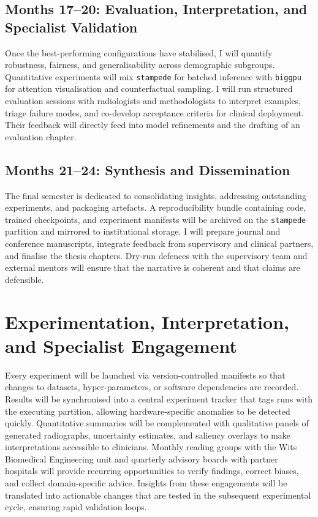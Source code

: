 \subsection{Months 17--20: Evaluation, Interpretation, and Specialist Validation}
Once the best-performing configurations have stabilised, I will quantify robustness, fairness, and generalisability across demographic subgroups. Quantitative experiments will mix \texttt{stampede} for batched inference with \texttt{biggpu} for attention visualisation and counterfactual sampling. I will run structured evaluation sessions with radiologists and methodologists to interpret examples, triage failure modes, and co-develop acceptance criteria for clinical deployment. Their feedback will directly feed into model refinements and the drafting of an evaluation chapter.
\subsection{Months 21--24: Synthesis and Dissemination}
The final semester is dedicated to consolidating insights, addressing outstanding experiments, and packaging artefacts. A reproducibility bundle containing code, trained checkpoints, and experiment manifests will be archived on the \texttt{stampede} partition and mirrored to institutional storage. I will prepare journal and conference manuscripts, integrate feedback from supervisory and clinical partners, and finalise the thesis chapters. Dry-run defences with the supervisory team and external mentors will ensure that the narrative is coherent and that claims are defensible.

\section{Experimentation, Interpretation, and Specialist Engagement}
Every experiment will be launched via version-controlled manifests so that changes to datasets, hyper-parameters, or software dependencies are recorded. Results will be synchronised into a central experiment tracker that tags runs with the executing partition, allowing hardware-specific anomalies to be detected quickly. Quantitative summaries will be complemented with qualitative panels of generated radiographs, uncertainty estimates, and saliency overlays to make interpretations accessible to clinicians. Monthly reading groups with the Wits Biomedical Engineering unit and quarterly advisory boards with partner hospitals will provide recurring opportunities to verify findings, correct biases, and collect domain-specific advice. Insights from these engagements will be translated into actionable changes that are tested in the subsequent experimental cycle, ensuring rapid validation loops.

